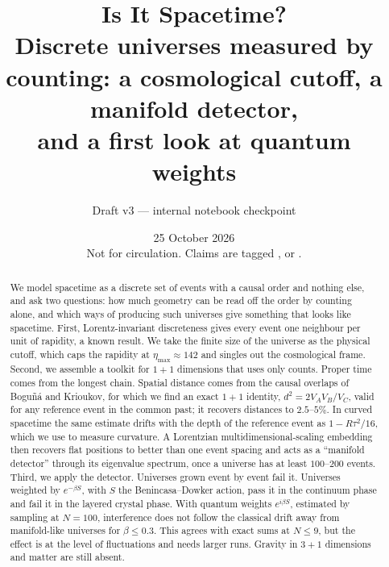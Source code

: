 \documentclass[11pt,a4paper]{article}
\title{Is It Spacetime?\\[4pt]
\large Discrete universes measured by counting: a cosmological cutoff, a manifold detector,\\ and a first look at quantum weights}
\author{Draft v3 --- internal notebook checkpoint}
\date{25 October 2026\\[2pt]\small Not for circulation. Claims are tagged \est, \lit{} or \ours.}
\begin{document}
\maketitle

\begin{abstract}
We model spacetime as a discrete set of events with a causal order and nothing else, and ask two questions: how much geometry can be read off the order by counting alone, and which ways of producing such universes give something that looks like spacetime. First, Lorentz-invariant discreteness gives every event one neighbour per unit of rapidity, a known result. We take the finite size of the universe as the physical cutoff, which caps the rapidity at $\eta_{\max}\approx142$ and singles out the cosmological frame. Second, we assemble a toolkit for $1+1$ dimensions that uses only counts. Proper time comes from the longest chain. Spatial distance comes from the causal overlaps of Boguñá and Krioukov, for which we find an exact $1+1$ identity, $d^2=2V_AV_B/V_C$, valid for any reference event in the common past; it recovers distances to $2.5$--$5\%$. In curved spacetime the same estimate drifts with the depth of the reference event as $1-R\tau^2/16$, which we use to measure curvature. A Lorentzian multidimensional-scaling embedding then recovers flat positions to better than one event spacing and acts as a ``manifold detector'' through its eigenvalue spectrum, once a universe has at least $100$--$200$ events. Third, we apply the detector. Universes grown event by event fail it. Universes weighted by $e^{-\beta S}$, with $S$ the Benincasa--Dowker action, pass it in the continuum phase and fail it in the layered crystal phase. With quantum weights $e^{i\beta S}$, estimated by sampling at $N=100$, interference does not follow the classical drift away from manifold-like universes for $\beta\le0.3$. This agrees with exact sums at $N\le9$, but the effect is at the level of fluctuations and needs larger runs. Gravity in $3+1$ dimensions and matter are still absent.
\end{abstract}
\end{document}
